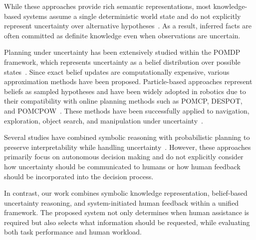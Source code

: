 While these approaches provide rich semantic representations, most knowledge-based systems assume a single deterministic world state and do not explicitly represent uncertainty over alternative hypotheses~\cite{yang2018peorl,bouguerra2008monitoring}. As a result, inferred facts are often committed as definite knowledge even when observations are uncertain.

Planning under uncertainty has been extensively studied within the POMDP framework, which represents uncertainty as a belief distribution over possible states~\cite{somani2013despot,bai2015intention,cramer2021probabilistic,bravo2019use}. Since exact belief updates are computationally expensive, various approximation methods have been proposed. Particle-based approaches represent beliefs as sampled hypotheses and have been widely adopted in robotics due to their compatibility with online planning methods such as POMCP, DESPOT, and POMCPOW~\cite{silver2010monte,somani2013despot,sunberg2018pomcpow}. These methods have been successfully applied to navigation, exploration, object search, and manipulation under uncertainty~\cite{lauri2016exploration,kim2021plgrim,xiao2019objectsearch,pajarinen2022composition}.

Several studies have combined symbolic reasoning with probabilistic planning to preserve interpretability while handling uncertainty~\cite{sanner2010symbolic,zhang2015corpp,serrano2021knowledge,li2026uncertainty,tang2025tru}. However, these approaches primarily focus on autonomous decision making and do not explicitly consider how uncertainty should be communicated to humans or how human feedback should be incorporated into the decision process.

In contrast, our work combines symbolic knowledge representation, belief-based uncertainty reasoning, and system-initiated human feedback within a unified framework. The proposed system not only determines when human assistance is required but also selects what information should be requested, while evaluating both task performance and human workload.
